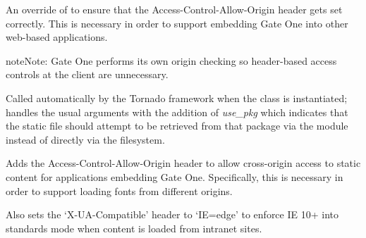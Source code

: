 \documentclass[letterpaper,10pt,openany]{sphinxmanual}
\begin{document}

\begin{fulllineitems}
\label{Developer/server:gateone.core.server.StaticHandler}
An override of  to ensure that the
Access-Control-Allow-Origin header gets set correctly.  This is necessary in
order to support embedding Gate One into other web-based applications.

\begin{notice}{note}{Note:}
Gate One performs its own origin checking so header-based access
controls at the client are unnecessary.
\end{notice}

\begin{fulllineitems}
\label{Developer/server:gateone.core.server.StaticHandler.initialize}
Called automatically by the Tornado framework when the {\hyperref[Developer/server:gateone.core.server.StaticHandler]{}}
class is instantiated; handles the usual arguments with the addition
of \emph{use\_pkg} which indicates that the static file should attempt to be
retrieved from that package via the  module instead of
directly via the filesystem.

\end{fulllineitems}


\begin{fulllineitems}
\label{Developer/server:gateone.core.server.StaticHandler.set_extra_headers}
Adds the Access-Control-Allow-Origin header to allow cross-origin
access to static content for applications embedding Gate One.
Specifically, this is necessary in order to support loading fonts
from different origins.

Also sets the `X-UA-Compatible' header to `IE=edge' to enforce IE 10+
into standards mode when content is loaded from intranet sites.

\end{fulllineitems}


\end{fulllineitems}
\end{document}
